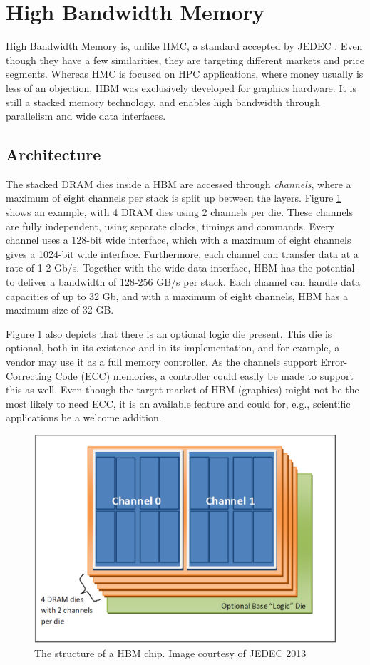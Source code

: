 \section{High Bandwidth Memory}
High Bandwidth Memory is, unlike HMC, a standard accepted by JEDEC \cite{standard2013high}. Even though they have a few similarities, they are targeting different markets and price segments. Whereas HMC is focused on HPC applications, where money usually is less of an objection, HBM was exclusively developed for graphics hardware. It is still a stacked memory technology, and enables high bandwidth through parallelism and wide data interfaces.

\subsection{Architecture}
The stacked DRAM dies inside a HBM are accessed through \emph{channels}, where a maximum of eight channels per stack is split up between the layers. Figure \ref{HBM-structure} shows an example, with 4 DRAM dies using 2 channels per die. These channels are fully independent, using separate clocks, timings and commands. Every channel uses a 128-bit wide interface, which with a maximum of eight channels gives a 1024-bit wide interface. Furthermore, each channel can transfer data at a rate of 1-2 Gb/s. Together with the wide data interface, HBM has the potential to deliver a bandwidth of 128-256 GB/s per stack. Each channel can handle data capacities of up to 32 Gb, and with a maximum of eight channels, HBM has a maximum size of 32 GB. 
\bigskip

Figure \ref{HBM-structure} also depicts that there is an optional logic die present. This die is optional, both in its existence and in its implementation, and for example, a vendor may use it as a full memory controller. As the channels support Error-Correcting Code (ECC) memories, a controller could easily be made to support this as well. Even though the target market of HBM (graphics) might not be the most likely to need ECC, it is an available feature and could for, e.g., scientific applications be a welcome addition. 

\begin{figure}[!h]
\centering
\includegraphics[width=0.75\linewidth]{figure/HBM_structure.PNG}
\caption{The structure of a HBM chip. Image courtesy of JEDEC 2013 }
\label{HBM-structure}
\end{figure}

